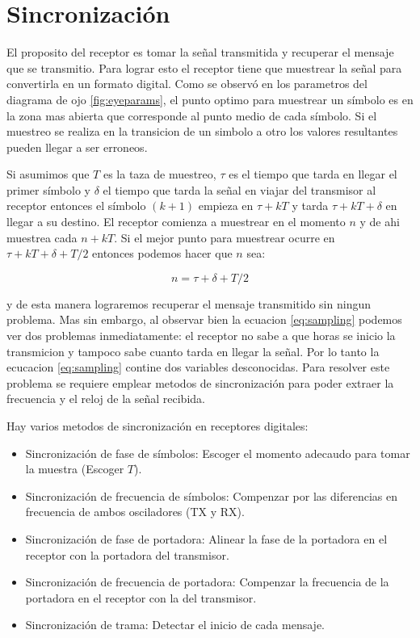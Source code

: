 \section{Sincronizaci\'on}
El proposito del receptor es tomar la se\~nal transmitida y recuperar el mensaje que se transmitio. Para lograr esto el receptor
tiene que muestrear la se\~nal para convertirla en un formato digital. Como se observ\'o en los parametros del diagrama de ojo
\ref{fig:eyeparams}, el punto optimo para muestrear un s\'imbolo es en la zona mas abierta que corresponde al punto medio de cada
s\'imbolo. Si el muestreo se realiza en la transicion de un simbolo a otro los valores resultantes pueden llegar a ser erroneos.

Si asumimos que $T$ es la taza de muestreo, $\tau$ es el tiempo que tarda en llegar el primer s\'imbolo y $\delta$ el tiempo que
tarda la se\~nal en viajar del transmisor al receptor entonces el s\'imbolo $(k+1)$ empieza en $\tau+kT$ y tarda $\tau+kT+\delta$
en llegar a su destino. El receptor comienza a muestrear en el momento $n$ y de ahi muestrea cada $n+kT$. Si el mejor punto para
muestrear ocurre en $\tau+kT+ \delta + T/2$ entonces podemos hacer que $n$ sea:

\begin{equation}\label{eq:sampling}
n=\tau+\delta+T/2
\end{equation}

y de esta manera lograremos recuperar el mensaje transmitido sin ningun problema. Mas sin embargo, al observar bien la ecuacion
\ref{eq:sampling} podemos ver dos problemas inmediatamente: el receptor no sabe a que horas se inicio la transmicion y tampoco
sabe cuanto tarda en llegar la se\~nal. Por lo tanto la ecucacion \ref{eq:sampling} contine dos variables desconocidas. Para
resolver este problema se requiere emplear metodos de sincronizaci\'on para poder extraer la frecuencia y el reloj de la se\~nal
recibida.

Hay varios metodos de sincronizaci\'on en receptores digitales:

\begin{itemize}
  \item Sincronizaci\'on de fase de s\'imbolos: Escoger el momento adecaudo para tomar la muestra (Escoger $T$).
  \item Sincronizaci\'on de frecuencia de s\'imbolos: Compenzar por las diferencias en frecuencia de ambos osciladores (TX y RX).
  \item Sincronizaci\'on de fase de portadora: Alinear la fase de la portadora en el receptor con la portadora del transmisor.
  \item Sincronizaci\'on de frecuencia de portadora: Compenzar la frecuencia de la portadora en el receptor con la del
  transmisor.
  \item Sincronizaci\'on de trama: Detectar el inicio de cada mensaje.
\end{itemize}

